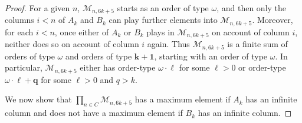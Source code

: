 \documentclass[11pt,a4paper,reqno]{amsart}
\theoremstyle{definition}
\newcommand{\mc}[1]{\mathcal{#1}}
\begin{document}
\begin{proof}
For a given $n$, $\mc{M}_{n, 6k+5}$ starts as an order of type $\omega$, and then only the columns $i < n$ of $A_k$ and $B_k$ can play further elements into $\mc{M}_{n, 6k+5}$.  Moreover, for each $i < n$, once either of $A_k$ or $B_k$ plays in $\mc{M}_{n, 6k+5}$ on account of column $i$, neither does so on account of column $i$ again.  Thus $\mc{M}_{n, 6k+5}$ is a finite sum of orders of type $\omega$ and orders of type $\bm{k+1}$, starting with an order of type $\omega$.  In particular, $\mc{M}_{n, 6k+5}$ either has order-type $\omega\cdot\bm{\ell}$ for some $\ell > 0$ or order-type $\omega\cdot\bm{\ell} + \bm{q}$ for some $\ell > 0$ and $q > k$.

We now show that $\prod_{n \in C} \mc{M}_{n, 6k+5}$ has a maximum element if $A_k$ has an infinite column and does not have a maximum element if $B_k$ has an infinite column.


\end{proof}
\end{document}
